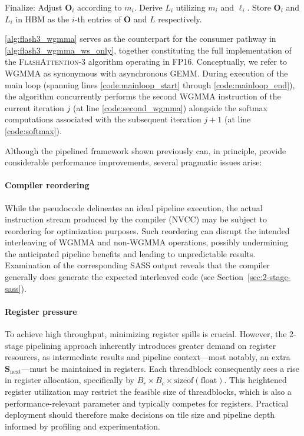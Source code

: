 \begin{enumerate}
\begin{algorithm}[H]
\begin{algorithmic}[1]
\STATE Finalize: Adjust $\mathbf{O}_{i}$ according to $m_{i}$. Derive $L_{i}$ utilizing $m_{i}$ and $\ell_{i}$.
Store $\mathbf{O}_{i}$ and $L_{i}$ in HBM as the $i$-th entries of $\mathbf{O}$ and $L$ respectively.
\end{algorithmic}
\end{algorithm}

\cref{alg:flash3_wgmma} serves as the counterpart for the consumer pathway in \cref{alg:flash3_wgmma_ws_only}, together constituting the full implementation of the \textsc{FlashAttention-3} algorithm operating in FP16. Conceptually, we refer to WGMMA as synonymous with asynchronous GEMM. During execution of the main loop (spanning lines \ref{code:mainloop_start} through \ref{code:mainloop_end}), the algorithm concurrently performs the second WGMMA instruction of the current iteration $j$ (at line \ref{code:second_wgmma}) alongside the softmax computations associated with the subsequent iteration $j+1$ (at line \ref{code:softmax}).

Although the pipelined framework shown previously can, in principle, provide considerable performance improvements, several pragmatic issues arise:

\paragraph{Compiler reordering} While the pseudocode delineates an ideal pipeline execution, the actual instruction stream produced by the compiler (NVCC) may be subject to reordering for optimization purposes. Such reordering can disrupt the intended interleaving of WGMMA and non-WGMMA operations, possibly undermining the anticipated pipeline benefits and leading to unpredictable results. Examination of the corresponding SASS output reveals that the compiler generally does generate the expected interleaved code (see Section~\ref{sec:2-stage-sass}).

\paragraph{Register pressure} To achieve high throughput, minimizing register spills is crucial. However, the 2-stage pipelining approach inherently introduces greater demand on register resources, as intermediate results and pipeline context—most notably, an extra $\mathbf{S}_{\mathrm{next}}$—must be maintained in registers. Each threadblock consequently sees a rise in register allocation, specifically by $B_r \times B_c \times \text{sizeof}(\text{float})$. This heightened register utilization may restrict the feasible size of threadblocks, which is also a performance-relevant parameter and typically competes for registers. Practical deployment should therefore make decisions on tile size and pipeline depth informed by profiling and experimentation.


\end{enumerate}
